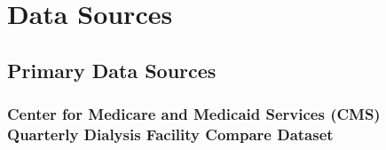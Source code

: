 \documentclass[
  11pt,
  letterpaper,
  DIV=11,
  numbers=noendperiod]{scrartcl}
\begin{document}
\section{Data Sources}\label{data-sources}

\subsection{Primary Data Sources}\label{primary-data-sources}

\subsubsection{Center for Medicare and Medicaid Services (CMS) Quarterly
Dialysis Facility Compare
Dataset}\label{center-for-medicare-and-medicaid-services-cms-quarterly-dialysis-facility-compare-dataset}
\end{document}
